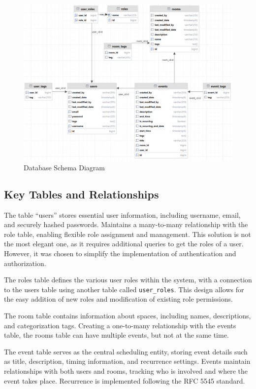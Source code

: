 \begin{figure}[h]
    \centering
    \includegraphics[width=1\textwidth]{schemaDB}
    \caption{Database Schema Diagram}
    \label{fig:schemaDB}
\end{figure}

\subsection{Key Tables and Relationships}\label{subsec:key-tables}

The table ``users'' stores essential user information, including username, email, and securely hashed passwords.
Maintains a many-to-many relationship with the role table, enabling flexible role assignment and management.
This solution is not the most elegant one, as it requires additional queries to get the roles of a user.
However, it was chosen to simplify the implementation of authentication and authorization.

The roles table defines the various user roles within the system, with a connection to the users table using another table called \texttt{user\_roles}.
This design allows for the easy addition of new roles and modification of existing role permissions.

The room table contains information about spaces, including names, descriptions, and categorization tags.
Creating a one-to-many relationship with the events table, the rooms table can have multiple events, but not at the same time.

The event table serves as the central scheduling entity, storing event details such as title, description, timing information, and recurrence settings.
Events maintain relationships with both users and rooms, tracking who is involved and where the event takes place.
Recurrence is implemented following the RFC 5545 standard\cite{rfc5545}.


